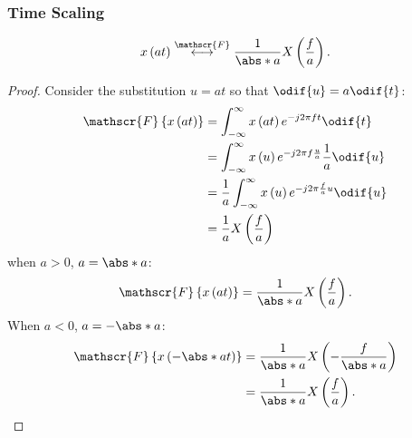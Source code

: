 \documentclass{article}
\begin{document}
\subsubsection{Time Scaling}
\begin{equation*}
    x\left( at \right) \overset{\mathscr{F}}{\longleftrightarrow} \frac{1}{\abs*{a}} X\left( \frac{f}{a} \right).
\end{equation*}
\begin{proof}
    Consider the substitution \(u = at\) so that \(\odif{u} = a \odif{t}\):
    \begin{align*}
        \mathscr{F}\left\{ x\left( at \right) \right\} & = \int_{-\infty}^\infty x\left( at \right) e^{-j 2\pi f t} \odif{t}                      \\
                                                       & = \int_{-\infty}^\infty x\left( u \right) e^{-j 2\pi f \frac{u}{a}} \frac{1}{a} \odif{u} \\
                                                       & = \frac{1}{a} \int_{-\infty}^\infty x\left( u \right) e^{-j 2\pi \frac{f}{a} u} \odif{u} \\
                                                       & = \frac{1}{a} X\left( \frac{f}{a} \right)
    \end{align*}
    when \(a > 0\), \(a = \abs*{a}\):
    \begin{equation*}
        \mathscr{F}\left\{ x\left( at \right) \right\} = \frac{1}{\abs*{a}} X\left( \frac{f}{a} \right).
    \end{equation*}
    When \(a < 0\), \(a = -\abs*{a}\):
    \begin{align*}
        \mathscr{F}\left\{ x\left( -\abs*{a} t \right) \right\} & = \frac{1}{\abs*{a}} X\left( -\frac{f}{\abs*{a}} \right) \\
                                                                & = \frac{1}{\abs*{a}} X\left( \frac{f}{a} \right).
    \end{align*}
\end{proof}
\end{document}
